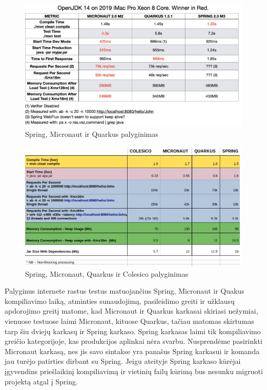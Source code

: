 \documentclass{VUMIFPSkursinis}
\begin{document}
			\begin{figure}[H]
			\includegraphics[scale=0.85]{img/one}
			\caption{Spring, Micronaut ir Quarkus palyginimas} %
			\label{img:kurimoProcesas}
			\end{figure}
			\begin{figure}[H]
			\includegraphics[scale=0.7]{img/two}
			\caption{Spring, Micronaut, Quarkus ir Colesico palyginimas} %
			\label{img:kurimoProcesas}
			\end{figure}
		Palyginus internete rastus testus matuojančius Spring, Micronaut ir Quakus kompiliavimo laiką, atminties sunaudojimą, pasileidimo greiti ir užklausų apdorojimo greitį
		matome, kad Micronaut ir Quarkus karkasai skiriasi nežymiai, vienuose testuose laimi Micronaut, kituose Quarkus, tačiau matomas  skirtumas tarp šiu dviejų karkasų ir Spring karkaso.
		Spring karkasas laimi tik kompiliavimo greičio kategorijoje, kas produkcijos aplinkai nėra svarbu.
		Nusprendėme pasirinkti Micronaut karkasą, nes jis savo sintakse yra panašus Spring karkasui ir komanda jau turėjo patirties dirbant su Spring.
		Jeigu ateityje Spring karkaso kūrėjai įgyvendins priešlaikinį kompiliavimą ir vietinių failų kūrimą bus nesunku migruoti projektą atgal į Spring.
\end{document}
